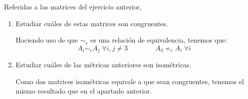 \begin{ejercicio} Referidas a las matrices del ejercicio anterior,
    \begin{enumerate}
        \item Estudiar cuáles de estas matrices son congruentes.

        Haciendo uso de que $\sim_c$ es una relación de equivalencia, tenemos que:
        \begin{equation*}
            A_i \sim_c A_j \;\forall i,j\neq 3
            \qquad \qquad
            A_3 \nsim_c A_i \; \forall i
        \end{equation*}

        \item Estudiar cuáles de las métricas anteriores son isométricas.

        Como dos matrices isométricas equivale a que sean congruentes, tenemos el mismo resultado que en el apartado anterior.
    \end{enumerate}
\end{ejercicio}

